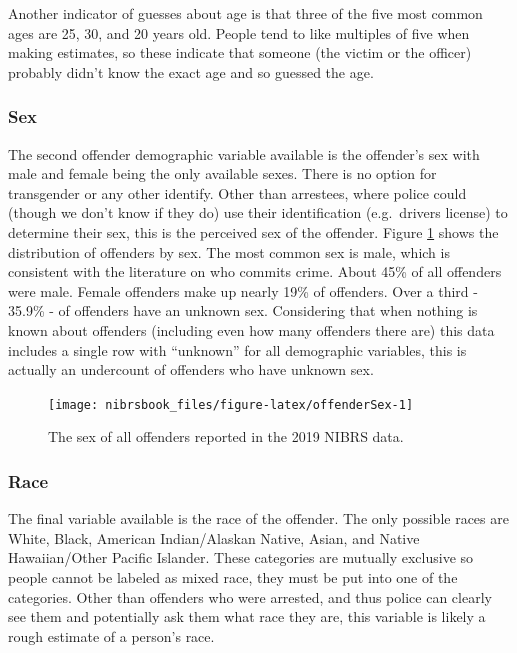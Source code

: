 \documentclass[
  12pt,
  openany]{book}
\begin{document}
Another indicator of guesses about age is that three of the five most common ages are 25, 30, and 20 years old. People tend to like multiples of five when making estimates, so these indicate that someone (the victim or the officer) probably didn't know the exact age and so guessed the age.

\hypertarget{sex}{%
\subsubsection{Sex}\label{sex}}

The second offender demographic variable available is the offender's sex with male and female being the only available sexes. There is no option for transgender or any other identify. Other than arrestees, where police could (though we don't know if they do) use their identification (e.g.~drivers license) to determine their sex, this is the perceived sex of the offender. Figure \ref{fig:offenderSex} shows the distribution of offenders by sex. The most common sex is male, which is consistent with the literature on who commits crime. About 45\% of all offenders were male. Female offenders make up nearly 19\% of offenders. Over a third - 35.9\% - of offenders have an unknown sex. Considering that when nothing is known about offenders (including even how many offenders there are) this data includes a single row with ``unknown'' for all demographic variables, this is actually an undercount of offenders who have unknown sex.

\begin{figure}

{\centering \texttt{[image: nibrsbook\_files/figure-latex/offenderSex-1]} 

}

\caption{The sex of all offenders reported in the 2019 NIBRS data.}\label{fig:offenderSex}
\end{figure}

\hypertarget{race}{%
\subsubsection{Race}\label{race}}

The final variable available is the race of the offender. The only possible races are White, Black, American Indian/Alaskan Native, Asian, and Native Hawaiian/Other Pacific Islander. These categories are mutually exclusive so people cannot be labeled as mixed race, they must be put into one of the categories. Other than offenders who were arrested, and thus police can clearly see them and potentially ask them what race they are, this variable is likely a rough estimate of a person's race.
\end{document}
